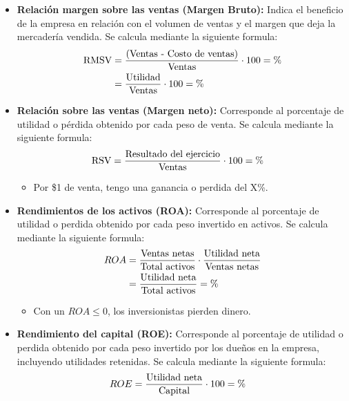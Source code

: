 \documentclass{templateNote}
\begin{document}
\begin{itemize}
    \item \textbf{Relación margen sobre las ventas (Margen Bruto):} Indica el beneficio de la empresa en relación con el volumen de ventas y el margen que deja la mercadería vendida. Se calcula mediante la siguiente formula:
    \begin{align*}
        \textnormal{RMSV} &= \frac{\textnormal{(\textnormal{Ventas} - \textnormal{Costo de ventas})}}{\textnormal{Ventas}} \cdot 100 = \% \\
        &= \frac{\textnormal{Utilidad}}{\textnormal{Ventas}} \cdot 100 = \%
    \end{align*}
    \item \textbf{Relación sobre las ventas (Margen neto):} Corresponde al porcentaje de utilidad o pérdida obtenido por cada peso de venta. Se calcula mediante la siguiente formula: 
    \begin{align*}
        \textnormal{RSV} &= \frac{\textnormal{Resultado del ejercicio}}{\textnormal{Ventas}} \cdot 100 = \%
    \end{align*}
    \begin{itemize}
        \item Por \$1 de venta, tengo una ganancia o perdida del X\%.
    \end{itemize}
    \item \textbf{Rendimientos de los activos (ROA):} Corresponde al porcentaje de utilidad o perdida obtenido por cada peso invertido en activos. Se calcula mediante la siguiente formula:
    \begin{align*}
        ROA &= \frac{\textnormal{Ventas netas}}{\textnormal{Total activos}} \cdot \frac{\textnormal{Utilidad neta}}{\textnormal{Ventas netas}}\\ 
        &= \frac{\textnormal{Utilidad neta}}{\textnormal{Total activos}} = \%
    \end{align*}
    \begin{itemize}
        \item Con un $ROA \leq 0$, los inversionistas pierden dinero.
    \end{itemize}
    \item \textbf{Rendimiento del capital (ROE):} Corresponde al porcentaje de utilidad o perdida obtenido por cada peso invertido por los dueños en la empresa, incluyendo utilidades retenidas. Se calcula mediante la siguiente formula:
    \begin{align*}
        ROE &= \frac{\textnormal{Utilidad neta}}{\textnormal{Capital}} \cdot 100 = \%
    \end{align*}
\end{itemize}
\end{document}
